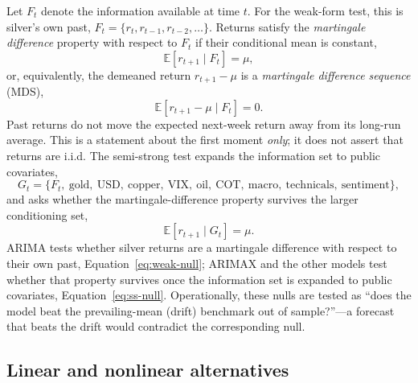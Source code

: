 \documentclass[12pt, a4paper]{article}
\newcommand{\E}{\mathbb{E}}
\begin{document}
Let \(F_t\) denote the information available at time \(t\). For the weak-form test, this
is silver's own past, \(F_t = \{r_t, r_{t-1}, r_{t-2}, \dots\}\). Returns satisfy the
\emph{martingale difference} property with respect to \(F_t\) if their conditional mean is
constant,
\begin{equation}
    \E[r_{t+1} \mid F_t] = \mu,
    \label{eq:weak-null}
\end{equation}
or, equivalently, the demeaned return \(r_{t+1} - \mu\) is a \emph{martingale difference
sequence} (MDS),
\begin{equation}
    \E[r_{t+1} - \mu \mid F_t] = 0.
    \label{eq:weak-null-mds}
\end{equation}
Past returns do not move the expected next-week return away from its long-run average.
This is a statement about the first moment \emph{only}; it does not assert that returns
are i.i.d. The semi-strong test expands the information set to public covariates,
\begin{equation}
    G_t = \{F_t,\ \text{gold},\ \text{USD},\ \text{copper},\ \text{VIX},\ \text{oil},\
    \text{COT},\ \text{macro},\ \text{technicals},\ \text{sentiment}\},
\end{equation}
and asks whether the martingale-difference property survives the larger conditioning set,
\begin{equation}
    \E[r_{t+1} \mid G_t] = \mu.
    \label{eq:ss-null}
\end{equation}
ARIMA tests whether silver returns are a martingale difference with respect to their own
past, Equation~\eqref{eq:weak-null}; ARIMAX and the other models test whether
that property survives once the information set is expanded to public covariates,
Equation~\eqref{eq:ss-null}. Operationally, these nulls are tested as ``does the model
beat the prevailing-mean (drift) benchmark out of sample?''---a forecast that beats the
drift would contradict the corresponding null.

\subsection{Linear and nonlinear alternatives}
\label{sec:framework-nonlin}
\end{document}
